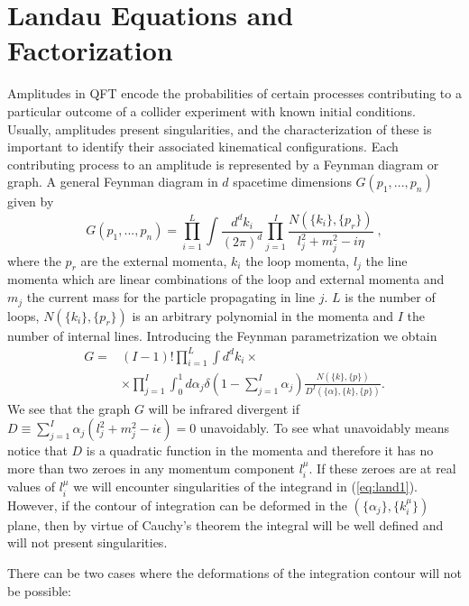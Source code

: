 \documentclass[%
 reprint,
 amsmath,amssymb,
 aps,
]{revtex4-1}
\begin{document}
\section{Landau Equations and Factorization}
Amplitudes in QFT encode the probabilities of certain processes contributing to a particular outcome of a collider experiment with known initial conditions. Usually, amplitudes present singularities, and the characterization of these is important to identify their associated kinematical configurations. Each contributing process to an amplitude is represented by a Feynman diagram or graph. A general Feynman diagram in $d$ spacetime dimensions $G(p_1,...,p_n)$ given by
\begin{equation}
G(p_1,...,p_n)=\prod_{i=1}^L\int \frac{d^dk_i}{(2\pi)^d} \prod_{j=1}^I\frac{N(\{k_i\},\{p_r\})}{l^2_j+m_j^2-i\eta}\;,
\end{equation}
where the $p_r$ are the external momenta, $k_i$ the loop momenta, $l_j$ the line momenta which are linear combinations of the loop and external momenta and $m_j$ the current mass for the particle propagating in line $j$. $L$ is the number of loops,  $N(\{k_i\},\{p_r\})$ is an arbitrary polynomial in the momenta and $I$ the number of internal lines. Introducing the Feynman parametrization we obtain
\begin{align}
G=&(I-1)!\prod_{i=1}^L\int d^dk_i \times\nonumber\\
&\times\prod_{j=1}^I\int_0^1d\alpha_j\delta(1-\sum_{j=1}^I\alpha_j)\frac{N( \{k\},\{p\})}{D^{I}(\{\alpha\}, \{k\},\{p\})}.\label{eq:land1}
\end{align}
We see that the graph $G$ will be infrared divergent if $D\equiv\sum_{j=1}^I\alpha_j(l_j^2+m_j^2-i\epsilon)=0$ unavoidably. To see what unavoidably means notice that $D$ is a quadratic function in the momenta and therefore it has no more than two zeroes in any momentum component $l_i^\mu$. If these zeroes are at real values of $l_i^\mu$ we will encounter singularities of the integrand in (\ref{eq:land1}). However, if the contour of integration can be deformed in the $(\{\alpha_j\},\{k_i^\mu\})$ plane, then by virtue of Cauchy's theorem the integral will be well defined and will not present singularities. \par 
There can be two cases where the deformations of the integration contour will not be possible:
\end{document}
